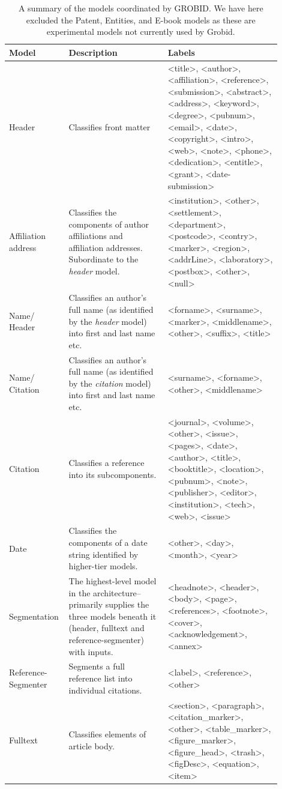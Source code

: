 \begin{center}
\begin{table}
\begin{tabular}{ | p{0.15\linewidth} | p{0.35\linewidth} | p{0.4\linewidth} |}
    \hline
    Model & Description & Labels \\ \hline
    Header & Classifies front matter & <title>, <author>, <affiliation>, <reference>, <submission>, <abstract>, <address>, <keyword>, <degree>, <pubnum>, <email>, <date>, <copyright>, <intro>, <web>, <note>, <phone>, <dedication>, <entitle>, <grant>, <date-submission> \\ \hline
    Affiliation address & Classifies the components of author affiliations and affiliation addresses. Subordinate to the \emph{header} model. & <institution>, <other>, <settlement>, <department>, <postcode>, <contry>, <marker>, <region>, <addrLine>, <laboratory>, <postbox>, <other>, <null> \\ \hline
    Name/ Header & Classifies an author's full name (as identified by the \emph{header} model) into first and last name etc.  & <forname>, <surname>, <marker>, <middlename>, <other>, <suffix>, <title> \\ \hline
    Name/ Citation &  Classifies an author's full name (as identified by the \emph{citation} model) into first and last name etc. & <surname>, <forname>, <other>, <middlename> \\ \hline
    Citation & Classifies a reference into its subcomponents. & <journal>, <volume>, <other>, <issue>, <pages>, <date>, <author>, <title>, <booktitle>, <location>, <pubnum>, <note>, <publisher>, <editor>, <institution>, <tech>, <web>, <issue> \\ \hline
    Date & Classifies the components of a date string identified by higher-tier models. & <other>, <day>, <month>, <year> \\ \hline
    Segmentation & The highest-level model in the architecture--primarily supplies the three models beneath it (header, fulltext and reference-segmenter) with inputs. & <headnote>, <header>, <body>, <page>, <references>, <footnote>, <cover>, <acknowledgement>, <annex> \\ \hline
    Reference-Segmenter & Segments a full reference list into individual citations. & <label>, <reference>, <other> \\ \hline
    Fulltext & Classifies elements of article body. & <section>, <paragraph>, <citation\_marker>, <other>, <table\_marker>, <figure\_marker>, <figure\_head>, <trash>, <figDesc>, <equation>, <item> \\ \hline
\end{tabular}
\caption{A summary of the models coordinated by GROBID. We have here excluded the Patent, Entities, and E-book models as these are experimental models not currently used by Grobid.}
\label{table:featurelist}
\end{table}
\end{center}

